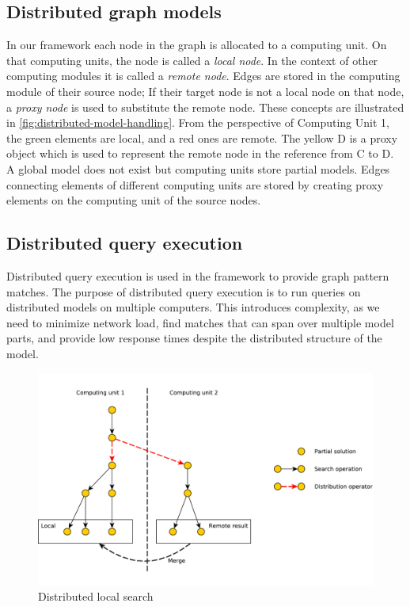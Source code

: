 \subsection{Distributed graph models}

In our framework each node in the graph is allocated to a computing unit. 
On that computing units, the node is called a \emph{local node}. 
In the context of other computing modules it is called a \emph{remote node}. 
Edges are stored in the computing module of their source node; 
If their target node is not a local node on that node, a \emph{proxy node} is used to substitute the remote node.
These concepts are illustrated in \autoref{fig:distributed-model-handling}.
From the perspective of Computing Unit 1, the green elements are local, and a red ones are remote. The yellow D is a proxy object which is used to represent the remote node in the reference from C to D.
A global model does not exist but computing units store partial models. Edges connecting elements of different computing units are stored by creating proxy elements on the computing unit of the source nodes. 


\subsection{Distributed query execution}

Distributed query execution is used in the framework to provide graph pattern matches.
The purpose of distributed query execution is to run queries on distributed models on multiple computers. 
This introduces complexity, as we need to minimize network load, find matches that can span over multiple model parts, and provide low response times despite the distributed structure of the model.


\begin{figure}[h]
	\begin{center}
		\includegraphics[width=\textwidth]{figures/distributed-ls.pdf}
		\caption{Distributed local search}
		\label{fig:distributed-ls}
	\end{center}
\end{figure}

